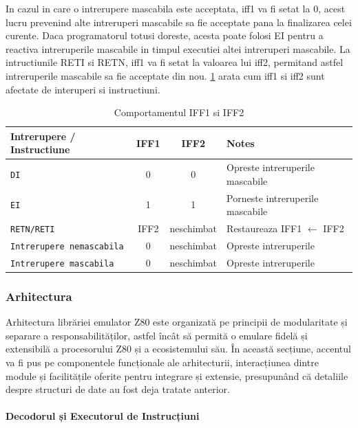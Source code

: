 \documentclass[titlepage,12pt]{article}
\DeclareRobustCommand{\code}[1]{{\ttfamily\small #1}}
\begin{document}
In cazul in care o intrerupere mascabila este acceptata, \code{iff1} va fi setat la 0, acest lucru prevenind alte intreruperi mascabile sa fie acceptate pana la finalizarea celei curente. Daca programatorul totusi doreste, acesta poate folosi \code{EI} pentru a reactiva intreruperile mascabile in timpul executiei altei intreruperi mascabile.
La intructiunile \code{RETI} si \code{RETN}, \code{iff1} va fi setat la valoarea lui \code{iff2}, permitand astfel intreruperile mascabile sa fie acceptate din nou.
\cref{tab:iff1iff2-interaction} arata cum \code{iff1} si \code{iff2} sunt afectate de interuperi si instructiuni.

\begin{table}[h!]
\centering
\begin{tabular}{|l|c|c|l|}
\hline
\textbf{Intrerupere / Instructiune} & \textbf{IFF1} & \textbf{IFF2} & \textbf{Notes} \\
\hline
\texttt{DI}                   & 0            & 0             & Opreste intreruperile mascabile \\
\texttt{EI}                   & 1            & 1             & Porneste intreruperile mascabile \\
\texttt{RETN/RETI}            & IFF2     & neschimbat     & Restaureaza IFF1 $\leftarrow$ IFF2 \\
\hline
\texttt{Intrerupere nemascabila} & 0         & neschimbat     & Opreste intreruperile \\
\texttt{Intrerupere mascabila}   & 0         & neschimbat     & Opreste intreruperile \\
\hline
\end{tabular}
\caption{Comportamentul \code{IFF1} si \code{IFF2}}
\label{tab:iff1iff2-interaction}
\end{table}

\subsubsection{Arhitectura}

Arhitectura librăriei emulator Z80 este organizată pe principii de modularitate și separare a responsabilităților, astfel încât să permită o emulare fidelă și extensibilă a procesorului Z80 și a ecosistemului său. În această secțiune, accentul va fi pus pe componentele funcționale ale arhitecturii, interacțiunea dintre module și facilitățile oferite pentru integrare și extensie, presupunând că detaliile despre structuri de date au fost deja tratate anterior.

\paragraph{Decodorul și Executorul de Instrucțiuni}
\end{document}
